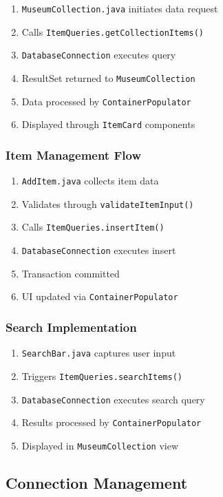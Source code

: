 \documentclass[12pt,a4paper]{article}
\begin{document}
\begin{enumerate}
    \item \texttt{MuseumCollection.java} initiates data request
    \item Calls \texttt{ItemQueries.getCollectionItems()}
    \item \texttt{DatabaseConnection} executes query
    \item ResultSet returned to \texttt{MuseumCollection}
    \item Data processed by \texttt{ContainerPopulator}
    \item Displayed through \texttt{ItemCard} components
\end{enumerate}

\subsubsection{Item Management Flow}
\begin{enumerate}
    \item \texttt{AddItem.java} collects item data
    \item Validates through \texttt{validateItemInput()}
    \item Calls \texttt{ItemQueries.insertItem()}
    \item \texttt{DatabaseConnection} executes insert
    \item Transaction committed
    \item UI updated via \texttt{ContainerPopulator}
\end{enumerate}

\subsubsection{Search Implementation}
\begin{enumerate}
    \item \texttt{SearchBar.java} captures user input
    \item Triggers \texttt{ItemQueries.searchItems()}
    \item \texttt{DatabaseConnection} executes search query
    \item Results processed by \texttt{ContainerPopulator}
    \item Displayed in \texttt{MuseumCollection} view
\end{enumerate}

\subsection{Connection Management}
\end{document}
